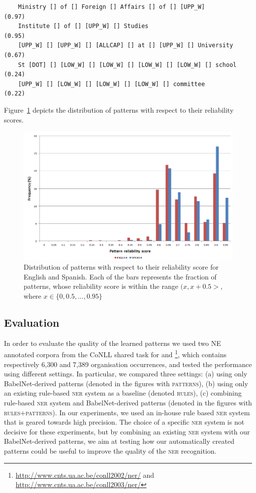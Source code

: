 \documentclass[output=paper]{langsci/langscibook}
\begin{document}
{\small
\begin{verbatim}
    Ministry [] of [] Foreign [] Affairs [] of [] [UPP_W]          (0.97)
    Institute [] of [] [UPP_W] [] Studies                          (0.95)
    [UPP_W] [] [UPP_W] [] [ALLCAP] [] at [] [UPP_W] [] University  (0.67)
    St [DOT] [] [LOW_W] [] [LOW_W] [] [LOW_W] [] [LOW_W] [] school (0.24)
    [UPP_W] [] [LOW_W] [] [LOW_W] [] [LOW_W] [] committee          (0.22)
\end{verbatim}
}

Figure~\ref{jac:pattern-distr} depicts the distribution of patterns with
respect to their reliability scores.

\begin{figure}
\centering
\includegraphics[width=.95\textwidth]{figures/patterns-distr.png}
\caption{\label{jac:pattern-distr}Distribution of patterns with respect to their reliability score for English and Spanish. Each of the bars represents the fraction of patterns, whose reliability score is within the range $(x,x+0.5>$, where $x \in \{0,0.5,...,0.95\}$}
\end{figure}

\subsection{Evaluation}
In order to evaluate the quality of the learned patterns we used two NE annotated corpora from the CoNLL shared task for  and \footnote{\url{http://www.cnts.ua.ac.be/conll2002/ner/} and \url{http://www.cnts.ua.ac.be/conll2003/ner/}}, which contains respectively 6,300 and 7,389 organisation occurrences, and tested the performance using different settings. In particular, we compared three settings: (a) using only BabelNet-derived patterns (denoted in the figures with \textsc{patterns}),  (b) using only an existing rule-based \textsc{ner} system as a baseline (denoted \textsc{rules}), (c) combining rule-based \textsc{ner} system and BabelNet-derived patterns (denoted in the figures with \textsc{rules+patterns}).
In our experiments, we used an in-house rule based \textsc{ner} system \citep{steinberger-11, ehrmann-15} that is geared towards high precision. The choice of a specific \textsc{ner} system is not decisive for these experiments, but by combining an existing \textsc{ner} system with our BabelNet-derived patterns, we aim at testing how our automatically created patterns could be useful to improve the quality of the \textsc{ner} recognition.
\end{document}
